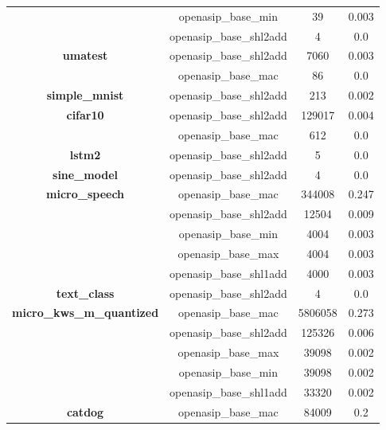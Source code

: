 \begin{table}[!hp]
\begin{tabular}{|c|c|c|c|}
                                  & openasip\_base\_min     & 39   & 0.003 \\ \cline{2-4}
                                  & openasip\_base\_shl2add & 4    & 0.0   \\ \hline
        \textbf{umatest} & openasip\_base\_shl2add & 7060  & 0.003 \\ \cline{2-4}
                          & openasip\_base\_mac     & 86    & 0.0   \\ \hline
        \textbf{simple\_mnist} & openasip\_base\_shl2add & 213   & 0.002 \\ \hline
        \textbf{cifar10} & openasip\_base\_shl2add & 129017 & 0.004 \\ \cline{2-4}
                          & openasip\_base\_mac     & 612    & 0.0   \\ \hline
        \textbf{lstm2} & openasip\_base\_shl2add & 5      & 0.0   \\ \hline
        \textbf{sine\_model} & openasip\_base\_shl2add & 4      & 0.0   \\ \hline
        \textbf{micro\_speech} & openasip\_base\_mac     & 344008 & 0.247 \\ \cline{2-4}
                                & openasip\_base\_shl2add & 12504  & 0.009 \\ \cline{2-4}
                                & openasip\_base\_min     & 4004   & 0.003 \\ \cline{2-4}
                                & openasip\_base\_max     & 4004   & 0.003 \\ \cline{2-4}
                                & openasip\_base\_shl1add & 4000   & 0.003 \\ \hline
        \textbf{text\_class} & openasip\_base\_shl2add & 4 & 0.0 \\ \hline
        \textbf{micro\_kws\_m\_quantized} & openasip\_base\_mac     & 5806058 & 0.273 \\ \cline{2-4}
                                            & openasip\_base\_shl2add & 125326  & 0.006 \\ \cline{2-4}
                                            & openasip\_base\_max     & 39098   & 0.002 \\ \cline{2-4}
                                            & openasip\_base\_min     & 39098   & 0.002 \\ \cline{2-4}
                                            & openasip\_base\_shl1add & 33320   & 0.002 \\ \hline
        \textbf{catdog} & openasip\_base\_mac     & 84009  & 0.2   \\ \cline{2-4}

\end{tabular}
\end{table}
